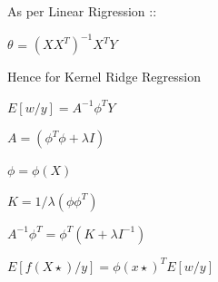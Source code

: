 \documentclass[12pt]{article}
\begin{document}
As per Linear Rigression :: \\

\begin{center}
\(\theta\)   = $(XX^{T})^{-1}X^{T}Y$ 

\end{center}

Hence for Kernel Ridge Regression \\

\begin{center}

$E\left [w/y  \right ] =  A^{-1}\phi ^{T}Y$\ \break
                      
$A = (\phi^{T} \phi + \lambda I )$ \break

$\phi =  \phi \left ( X \right )$ \break

$K = 1/\lambda \left ( \phi \phi ^{T} \right )$ \break

$A^{-1}\phi ^{T} = \phi ^{T}\left ( K + \lambda I^{-1} \right )$ \break

$E\left [ f\left ( X\star  \right )/y \right ] = \phi \left ( x\star  \right )^{T}E\left [ w/y \right ]$

\end{center}
\end{document}
